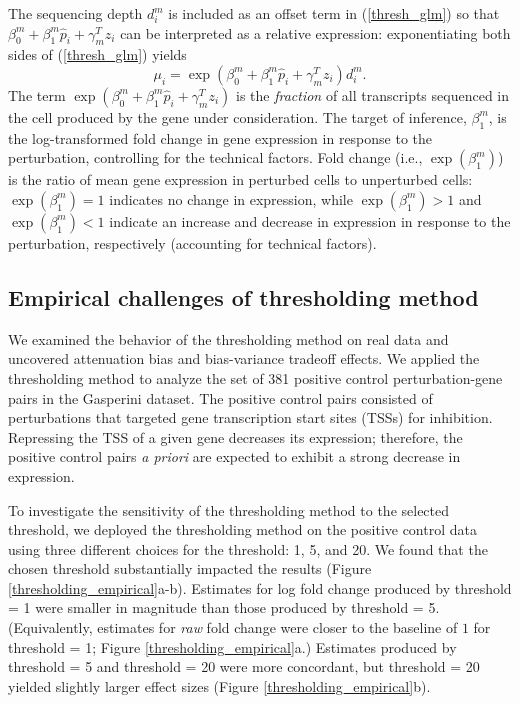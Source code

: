\documentclass[12pt]{article}
\begin{document}
The sequencing depth $d^m_i$ is included as an offset term in (\ref{thresh_glm}) so that $\beta^m_0 + \beta^m_1 \hat{p}_i + \gamma^T_m z_i$ can be interpreted as a relative expression: exponentiating both sides of (\ref{thresh_glm}) yields
$$\mu_i = \exp \left( \beta^m_0 + \beta^m_1 \hat{p}_i + \gamma^T_m z_i \right) d_i^m.$$ The term $\exp \left( \beta^m_0 + \beta^m_1 \hat{p}_i + \gamma^T_m z_i \right)$ is the \textit{fraction} of all transcripts sequenced in the cell produced by the gene under consideration. The target of inference, $\beta^m_1$, is the log-transformed fold change in gene expression in response to the perturbation, controlling for the technical factors. Fold change (i.e., $\exp(\beta^m_1)$) is the ratio of mean gene expression in perturbed cells to unperturbed cells: $\exp(\beta^m_1) = 1$ indicates no change in expression, while $\exp(\beta^m_1) > 1$ and $\exp(\beta^m_1) < 1$ indicate an increase and decrease in expression in response to the perturbation, respectively (accounting for technical factors).

\subsection{Empirical challenges of thresholding method}\label{sec:thresholding_empirical}

We examined the behavior of the thresholding method on real data and uncovered attenuation bias and bias-variance tradeoff effects. We applied the thresholding method to analyze the set of 381 positive control perturbation-gene pairs in the Gasperini dataset. The positive control pairs consisted of perturbations that targeted gene transcription start sites (TSSs) for inhibition. Repressing the TSS of a given gene decreases its expression; therefore, the positive control pairs \textit{a priori} are expected to exhibit a strong decrease in expression.

To investigate the sensitivity of the thresholding method to the selected threshold, we deployed the thresholding method on the positive control data using three different choices for the threshold: 1, 5, and 20. We found that the chosen threshold substantially impacted the results (Figure \ref{thresholding_empirical}a-b). Estimates for log fold change produced by threshold = 1 were smaller in magnitude than those produced by threshold = 5. (Equivalently, estimates for \textit{raw} fold change were closer to the baseline of $1$ for threshold = 1; Figure \ref{thresholding_empirical}a.) Estimates produced by threshold = 5 and threshold = 20 were more concordant, but threshold = 20 yielded slightly larger effect sizes (Figure \ref{thresholding_empirical}b).
\end{document}

